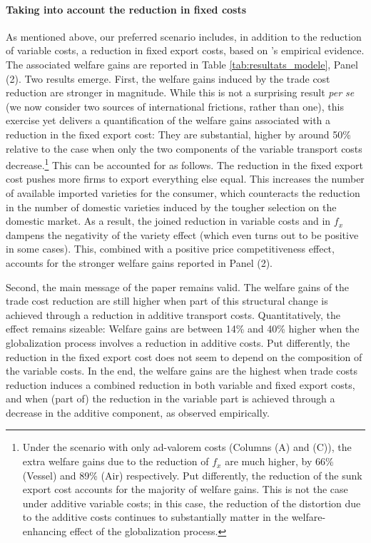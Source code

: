 \documentclass[a4paper,11pt]{article}
\begin{document}
\paragraph{Taking into account the reduction in fixed costs} As mentioned above, our preferred scenario includes, in addition to the reduction of variable costs, a reduction in fixed export costs, based on \cite{Lincoln_McCallum2018}'s empirical evidence.
The associated welfare gains are reported in Table \ref{tab:resultats_modele}, Panel (2).
Two results emerge.
First, the welfare gains induced by the trade cost reduction are stronger in magnitude.
While this is not a surprising result \textit{per se} (we now consider two sources of international frictions, rather than one), this exercise yet delivers a quantification of the welfare gains associated with a reduction in the fixed export cost: They are substantial, higher by around 50\% relative to the case when only the two components of the variable transport costs decrease.\footnote{Under the scenario with only ad-valorem costs (Columns (A) and (C)), the extra welfare gains due to the reduction of $f_x$ are much higher, by 66\% (Vessel) and 89\% (Air) respectively. Put differently, the reduction of the sunk export cost accounts for the majority of welfare gains. This is not the case under additive variable costs; in this case, the reduction of the distortion due to the additive costs continues to substantially matter in the welfare-enhancing effect of the globalization process.}  This can be accounted for as follows. The reduction in the fixed export cost pushes more firms to export everything else equal. This increases the number of available imported varieties for the consumer, which counteracts the reduction in the number of domestic varieties induced by the tougher selection on the domestic market. As a result, the joined reduction in variable costs and in $f_x$ dampens the negativity of the variety effect (which even turns out to be positive in some cases). This, combined with a positive price competitiveness effect, accounts for the stronger welfare gains reported in Panel (2).

Second, the main message of the paper remains valid. The welfare gains of the trade cost reduction are still higher when part of this structural change is achieved through a reduction in additive transport costs. Quantitatively, the effect remains sizeable: Welfare gains are between 14\% and 40\% higher when the globalization process involves a reduction in additive costs. Put differently, the reduction in the fixed export cost does not seem to depend on the composition of the variable costs. In the end, the welfare gains are the highest when trade costs reduction induces a combined reduction in both variable and fixed export costs, and when (part of) the reduction in the variable part is achieved through a decrease in the additive component, as observed empirically.\smallskip
\end{document}
